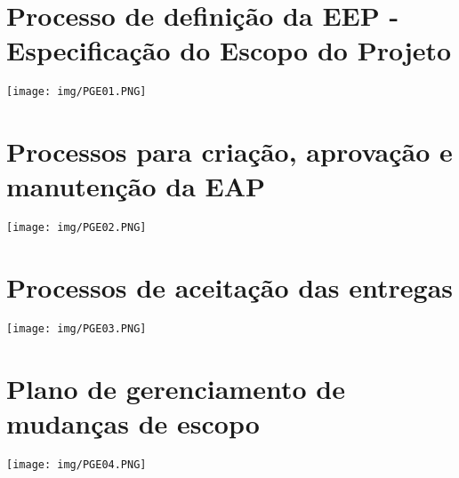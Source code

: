 \documentclass[12pt]{charter}
\begin{document}
\maketitle
\thispagestyle{empty}
\newpage

\section*{Processo de definição da EEP - Especificação do Escopo do Projeto}
\label{sec:ciclovida}

\texttt{[image: img/PGE01.PNG]}

\section*{Processos para criação, aprovação e manutenção da EAP}
\label{sec:ciclovida}

\texttt{[image: img/PGE02.PNG]}


\section*{Processos de aceitação das entregas}
\label{sec:ciclovida}

\texttt{[image: img/PGE03.PNG]}


\section*{Plano de gerenciamento de mudanças de escopo}
\label{sec:ciclovida}

\texttt{[image: img/PGE04.PNG]}


\newline

\newline


\end{document}
